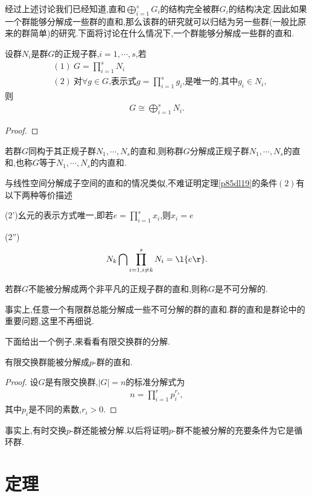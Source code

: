 经过上述讨论我们已经知道,直和$\bigoplus_{i=1}^{s}G_i$的结构完全被群$G_i$的结构决定.因此如果一个群能够分解成一些群的直和,那么该群的研究就可以归结为另一些群(一般比原来的群简单)的研究.下面将讨论在什么情况下,一个群能够分解成一些群的直和.
\begin{theorem}\label{p85dl19}
    设群$N_i$是群$G$的正规子群,$i=1,\cdots,s$,若\begin{align*}
        &(1)\ G=\prod_{i=1}^{s}N_i\\
        &(2)\ \text{对$\forall g\in G$,表示式$g=\prod_{i=1}^{s}g_i$,是唯一的,其中$g_i\in N_i$},
    \end{align*}则\begin{align*}
        G\cong\bigoplus_{i=1}^{s}N_i.
    \end{align*}
\end{theorem}
\begin{proof}
    \stars
\end{proof}
\begin{definition}[内直和]\label{nzh}
    若群$G$同构于其正规子群$N_1,\cdots,N_s$的直和,则称群$G$分解成正规子群$N_1,\cdots,N_s$的直和,也称$G$等于$N_1,\cdots,N_s$的内直和.
\end{definition}
与线性空间分解成子空间的直和的情况类似,不难证明定理\ref{p85dl19}的条件$(2)$有以下两种等价描述

(2')幺元的表示方式唯一,即若$e=\prod_{i=1}^sx_i$,则$x_i=e$

(2'')\stars\begin{align*}
    N_k\bigcap\prod_{i=1,i\neq k}^{s}N_i=\l\{e\r\}.
\end{align*}
\begin{definition}[不可分解的]
    若群$G$不能被分解成两个非平凡的正规子群的直和,则称$G$是不可分解的.
\end{definition}
事实上,任意一个有限群总能分解成一些不可分解的群的直和.群的直和是群论中的重要问题,这里不再细说.

下面给出一个例子,来看看有限交换群的分解.
\begin{example}
    有限交换群能被分解成$p$-群的直和.
\end{example}
\begin{proof}
    设$G$是有限交换群,$|G|=n$的标准分解式为\begin{align*}
        n=\prod_{i=1}^{r}p_i^{r_s},
    \end{align*}其中$p_i$是不同的素数,$r_i>0$.

    \stars
\end{proof}
\begin{remark}
    事实上,有时交换$p$-群还能被分解.以后将证明$p$-群不能被分解的充要条件为它是循环群.
\end{remark}










\section{{\JH}定理}